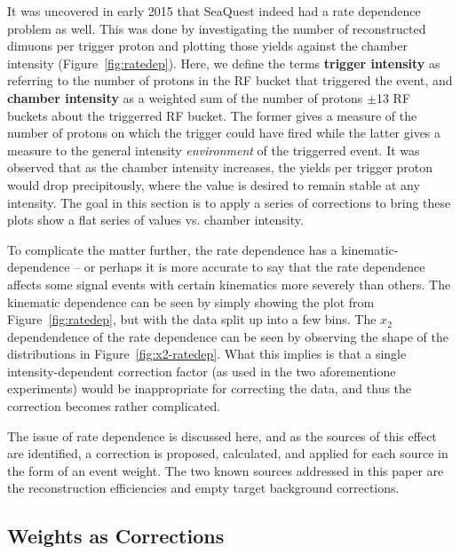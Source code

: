 It was uncovered in early 2015 that SeaQuest indeed had a rate dependence problem as well. This was done by investigating the number of reconstructed dimuons per trigger proton and plotting those yields against the chamber intensity (Figure~\ref{fig:ratedep}). Here, we define the terms \textbf{trigger intensity} as referring to the number of protons in the RF bucket that triggered the event, and \textbf{chamber intensity} as a weighted sum of the number of protons $\pm$13 RF buckets about the triggerred RF bucket. The former gives a measure of the number of protons on which the trigger could have fired while the latter gives a measure to the general intensity \emph{environment} of the triggerred event. It was observed that as the chamber intensity increases, the yields per trigger proton would drop precipitously, where the value is desired to remain stable at any intensity. The goal in this section is to apply a series of corrections to bring these plots show a flat series of values vs. chamber intensity.

To complicate the matter further, the rate dependence has a kinematic-dependence -- or perhaps it is more accurate to say that the rate dependence affects some signal events with certain kinematics more severely than others. The kinematic dependence can be seen by simply showing the plot from Figure~\ref{fig:ratedep}, but with the data split up into a few bins. The $x_2$ dependendence of the rate dependence can be seen by observing the shape of the distributions in Figure~\ref{fig:x2-ratedep}. What this implies is that a single intensity-dependent correction factor (as used in the two aforementione experiments) would be inappropriate for correcting the data, and thus the correction becomes rather complicated.

The issue of rate dependence is discussed here, and as the sources of this effect are identified, a correction is proposed, calculated, and applied for each source in the form of an event weight. The two known sources addressed in this paper are the reconstruction efficiencies and empty target background corrections.

\subsection{Weights as Corrections}

